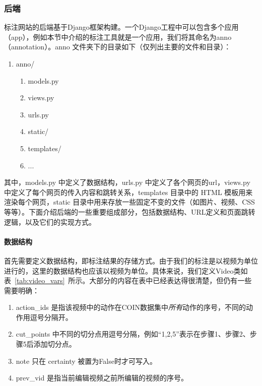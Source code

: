 \subsubsection{后端}
标注网站的后端基于Django\cite{django}框架构建。一个Django工程中可以包含多个应用（app），例如本节中介绍的标注工具就是一个应用，我们将其命名为anno（annotation）。anno 文件夹下的目录如下（仅列出主要的文件和目录）：
\begin{enumerate}
    \item anno/
    \begin{enumerate}
        \item models.py
        \item views.py
        \item urls.py
        \item static/
        \item templates/
        \item ...
    \end{enumerate}
\end{enumerate}
其中，models.py 中定义了数据结构，urls.py 中定义了各个网页的url，views.py 中定义了每个网页的传入内容和跳转关系，templates 目录中的 HTML 模板用来渲染每个网页，static 目录中用来存放一些固定不变的文件（如图片、视频、CSS 等等）。下面介绍后端的一些重要组成部分，包括数据结构、URL定义和页面跳转逻辑，以及它们的实现方式。

\paragraph{数据结构} 首先需要定义数据结构，即标注结果的存储方式。由于我们的标注是以视频为单位进行的，这里的数据结构也应该以视频为单位。具体来说，我们定义Video类如表~\ref{tab:video_vars}~所示。大部分的内容在表中已经表达得很清楚，但仍有一些需要明确：
\begin{enumerate}
    \item action\_ids 是指该视频中的动作在COIN数据集中\emph{所有}动作的序号，不同的动作用逗号分隔开。
    \item cut\_points 中不同的切分点用逗号分隔，例如“1,2,5”表示在步骤1、步骤2、步骤5后添加切分点。
    \item note 只在 certainty 被置为False时才可写入。
    \item prev\_vid 是指当前编辑视频之前所编辑的视频的序号。
\end{enumerate}

